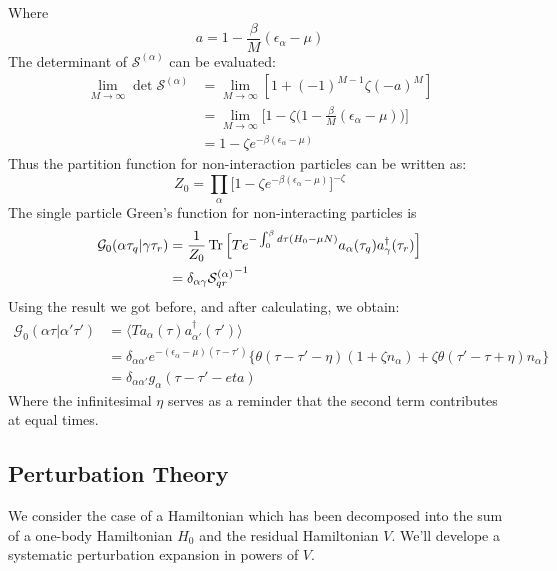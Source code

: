 \documentclass[12pt]{article}
\begin{document}
Where 
\begin{equation*}
    a=1-\frac{\beta}{M}(\epsilon_\alpha-\mu)
\end{equation*}
The determinant of $\mathcal{S}^{(\alpha)}$ can be evaluated:
\begin{equation*}
    \begin{split}
        \lim_{M\rightarrow\infty}\det\mathcal{S}^{(\alpha)}&=
        \lim_{M\rightarrow\infty}[1+(-1)^{M-1}\zeta(-a)^M]\\
        &=\lim_{M\rightarrow\infty}\Big[1-\zeta
        \Big(1-\frac{\beta}{M}(\epsilon_\alpha-\mu)\Big)\Big]\\
        &=1-\zeta e^{-\beta(\epsilon_\alpha-\mu)}
    \end{split}
\end{equation*}
Thus the partition function for non-interaction particles can be written as:
\begin{equation*}
    Z_0=\prod_\alpha\Big[1-\zeta e^{-\beta(\epsilon_\alpha-\mu)}\Big]^{-\zeta}
\end{equation*}
The single particle Green's function for non-interacting particles is 
\begin{equation*}
    \begin{split}
        \mathcal{G}_0(\alpha\tau_q|\gamma\tau_r)&=\frac{1}{Z_0}\Tr\Big[Te^{
        -\int_0^\beta d\tau(H_0-\mu N)}a_\alpha(\tau_q)a^\dagger_\gamma(\tau_r)\Big]\\
        &=\delta_{\alpha\gamma}{\mathcal{S}_{qr}^{(\alpha)}}^{-1}
    \end{split}
\end{equation*}
Using the result we got before, and after calculating, we obtain:
\begin{equation*}
    \begin{split}
        \mathcal{G}_0(\alpha\tau|\alpha'\tau')&=\langle Ta_\alpha(\tau)
        a^\dagger_{\alpha'}(\tau')\rangle\\
        &=\delta_{\alpha\alpha'}e^{-(\epsilon_\alpha-\mu)(\tau-\tau')}
        \{\theta(\tau-\tau'-\eta)(1+\zeta n_\alpha)+\zeta\theta(\tau'-\tau+\eta)
        n_\alpha\}\\
        &=\delta_{\alpha\alpha'}g_\alpha(\tau-\tau'-eta)
    \end{split}
\end{equation*}
Where the infinitesimal $\eta$ serves as a reminder that the second term 
contributes at equal times.
\subsection*{Perturbation Theory}
We consider the case of a Hamiltonian which has been decomposed into the sum of a 
one-body Hamiltonian $H_0$ and the residual Hamiltonian $V$. We'll develope a 
systematic perturbation expansion in powers of $V$.
\end{document}
